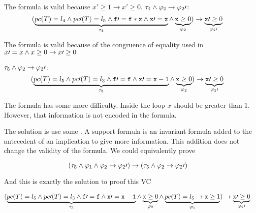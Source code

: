 	The formula is valid because $x\prime \geq 1 \to x\prime \geq 0$.
	\; $\tau_4 \wedge \varphi_2 \to \varphi_2\prime $:	
	\begin{equation*}
		(
			\underbrace{pc(T) = l_4 \wedge pc\prime (T) = l_5 \wedge \mathtt{f}\prime  = \mathtt{f*x} \wedge \mathtt{x\prime =x}}_{\tau_4} \wedge \underbrace{\mathtt{x} \geq 0}_{\varphi_2}
		) 
			\to \underbrace{\mathtt{x}\prime  \geq 0}_{\varphi_2\prime }\\\\
	\end{equation*}


	The formula is valid because of the congruence of equality used in  $x\prime =x \wedge x\geq 0 \to x\prime \geq 0$ 

	\; $\tau_5 \wedge \varphi_2 \to \varphi_2\prime $:	
	\begin{equation*}
		(
			\underbrace{pc(T) = l_5 \wedge pc\prime (T) = l_3 \wedge \mathtt{f\prime =f} \wedge \mathtt{x\prime =x-1}}_{\tau_5} \wedge \underbrace{\mathtt{x} \geq 0}_{\varphi_2}
		) 
			\to \underbrace{\mathtt{x}\prime  \geq 0}_{\varphi_2\prime }\\\\
	\end{equation*}


	The formula has some more difficulty. 
	Inside the loop $x$ should be greater than 1.
	However, that information is not encoded in the formula.
	
	The solution is use some .
	A support formula is an invariant formula added to the antecedent of an implication to give more information. 
	This addition does not change the validity of the formula.
	We could equivalently prove

	\[
		(\tau_5 \wedge \varphi_1 \wedge \varphi_2 \to \varphi_2\prime ) \rightarrow (\tau_5\wedge \varphi_2\to\varphi_2\prime )
	\]

	And this is exactly the solution to proof this \gls{VC}

	

	\begin{equation*}
		(
			\underbrace{pc(T) = l_5 \wedge pc\prime (T) = l_3 \wedge \mathtt{f\prime =f} \wedge \mathtt{x\prime =x-1}}_{\tau_5} \wedge \underbrace{\mathtt{x} \geq 0}_{\varphi_2} \wedge \underbrace{pc(T) = l_5 \to \mathtt{x} \geq 1}_{\varphi_1}
		) 
			\to \underbrace{\mathtt{x}\prime  \geq 0}_{\varphi_2\prime }\\\\
	\end{equation*}


